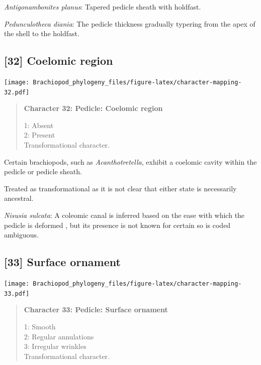 \documentclass[openany]{book}
\begin{document}
\hypertarget{Antigonambonites_planus-coding-31}{}
\emph{Antigonambonites planus}: Tapered pedicle sheath with holdfast.

\hypertarget{Pedunculotheca_diania-coding-31}{}
\emph{Pedunculotheca diania}: The pedicle thickness gradually typering
from the apex of the shell to the holdfast.

\subsection*{{[}32{]} Coelomic region}\label{coelomic-region}

\texttt{[image: Brachiopod\_phylogeny\_files/figure-latex/character-mapping-32.pdf]}

\begin{quote}
\textbf{Character 32: Pedicle: Coelomic region}

1: Absent\\
2: Present\\
Transformational character.
\end{quote}

Certain brachiopods, such as \emph{Acanthotretella}, exhibit a coelomic
cavity within the pedicle or pedicle sheath.

Treated as transformational as it is not clear that either state is
necessarily ancestral.

\hypertarget{Nisusia_sulcata-coding-32}{}
\emph{Nisusia sulcata}: A coleomic canal is inferred based on the ease
with which the pedicle is deformed
\citep{Holmer2018Evolutionarysignificance}, but its presence is not
known for certain so is coded ambiguous.

\subsection*{{[}33{]} Surface ornament}\label{surface-ornament-1}

\texttt{[image: Brachiopod\_phylogeny\_files/figure-latex/character-mapping-33.pdf]}

\begin{quote}
\textbf{Character 33: Pedicle: Surface ornament}

1: Smooth\\
2: Regular annulations\\
3: Irregular wrinkles\\
Transformational character.
\end{quote}
\end{document}
